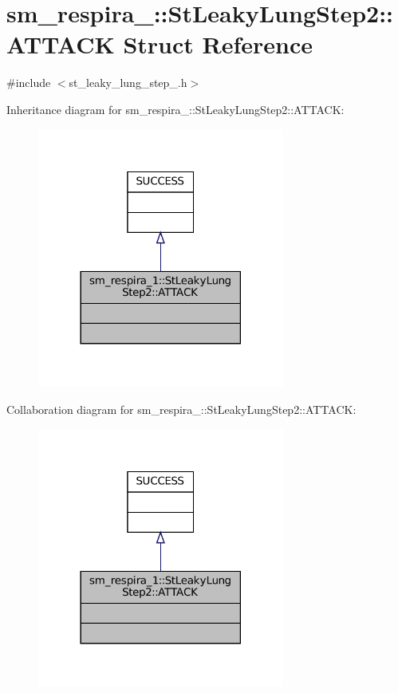 \hypertarget{structsm__respira__1_1_1StLeakyLungStep2_1_1ATTACK}{}\section{sm\+\_\+respira\+\_\+:\+:St\+Leaky\+Lung\+Step2\+:\+:A\+T\+T\+A\+CK Struct Reference}
\label{structsm__respira__1_1_1StLeakyLungStep2_1_1ATTACK}


{\ttfamily \#include $<$st\+\_\+leaky\+\_\+lung\+\_\+step\+\_.\+h$>$}



Inheritance diagram for sm\+\_\+respira\+\_\+:\+:St\+Leaky\+Lung\+Step2\+:\+:A\+T\+T\+A\+CK\+:
\nopagebreak
\begin{figure}[H]
\begin{center}
\leavevmode
\includegraphics[width=230pt]{structsm__respira__1_1_1StLeakyLungStep2_1_1ATTACK__inherit__graph}
\end{center}
\end{figure}


Collaboration diagram for sm\+\_\+respira\+\_\+:\+:St\+Leaky\+Lung\+Step2\+:\+:A\+T\+T\+A\+CK\+:
\nopagebreak
\begin{figure}[H]
\begin{center}
\leavevmode
\includegraphics[width=230pt]{structsm__respira__1_1_1StLeakyLungStep2_1_1ATTACK__coll__graph}
\end{center}
\end{figure}


